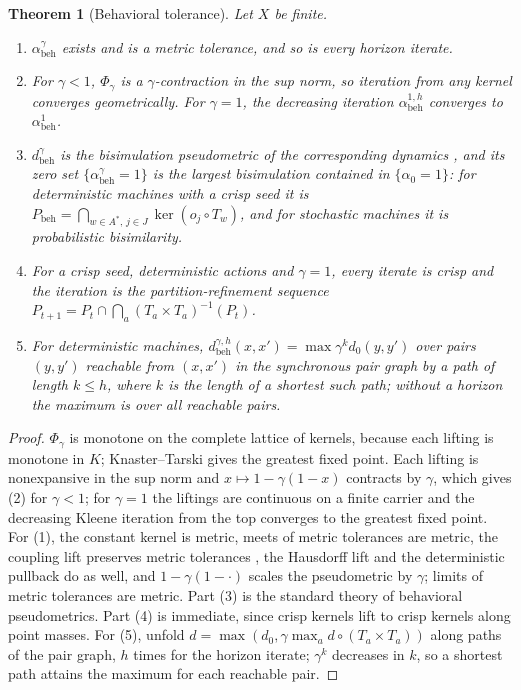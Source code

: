\documentclass[11pt]{article}
\newcommand{\abeh}{\alpha_{\mathrm{beh}}}
\newcommand{\dbeh}{d_{\mathrm{beh}}}
\newcommand{\Pbeh}{P_{\mathrm{beh}}}
\theoremstyle{definition}
\theoremstyle{plain}
\newtheorem{theorem}[definition]{Theorem}
\begin{document}
\begin{theorem}[Behavioral tolerance]\label{thm:behavioral}
Let $X$ be finite.
\begin{enumerate}
\item $\abeh^\gamma$ exists and is a metric tolerance, and so is every horizon iterate.
\item For $\gamma<1$, $\Phi_\gamma$ is a $\gamma$-contraction in the sup norm, so iteration from
any kernel converges geometrically. For $\gamma=1$, the decreasing iteration $\abeh^{1,h}$
converges to $\abeh^1$.
\item $\dbeh^\gamma$ is the bisimulation pseudometric of the corresponding dynamics
\cite{dgjp,vbw,ferns}, and its zero set $\{\abeh^\gamma=1\}$ is the largest bisimulation
contained in $\{\alpha_0=1\}$: for deterministic machines with a crisp seed it is
$\Pbeh=\bigcap_{w\in A^*,\,j\in J}\ker(o_j\circ T_w)$, and for stochastic machines it is
probabilistic bisimilarity.
\item For a crisp seed, deterministic actions and $\gamma=1$, every iterate is crisp and the
iteration is the partition-refinement sequence $P_{t+1}=P_t\cap\bigcap_a(T_a\times
T_a)^{-1}(P_t)$.
\item For deterministic machines, $\dbeh^{\gamma,h}(x,x')=\max\gamma^{k}d_0(y,y')$ over pairs
$(y,y')$ reachable from $(x,x')$ in the synchronous pair graph by a path of length $k\le h$, where
$k$ is the length of a shortest such path; without a horizon the maximum is over all reachable
pairs.
\end{enumerate}
\end{theorem}

\begin{proof}
$\Phi_\gamma$ is monotone on the complete lattice of kernels, because each lifting is monotone in
$K$; Knaster--Tarski gives the greatest fixed point. Each lifting is nonexpansive in the sup norm
and $x\mapsto1-\gamma(1-x)$ contracts by $\gamma$, which gives (2) for $\gamma<1$; for $\gamma=1$
the liftings are continuous on a finite carrier and the decreasing Kleene iteration from the top
converges to the greatest fixed point. For (1), the constant kernel is metric, meets of metric
tolerances are metric, the coupling lift preserves metric tolerances \cite[Theorem~6.13]{dclosure},
the Hausdorff lift and the deterministic pullback do as well, and $1-\gamma(1-\cdot)$ scales the
pseudometric by $\gamma$; limits of metric tolerances are metric. Part (3) is the standard theory
of behavioral pseudometrics. Part (4) is immediate, since crisp kernels lift to crisp kernels along
point masses. For (5), unfold $d=\max(d_0,\gamma\max_a d\circ(T_a\times T_a))$ along paths of the
pair graph, $h$ times for the horizon iterate; $\gamma^k$ decreases in $k$, so a shortest path
attains the maximum for each reachable pair.
\end{proof}
\end{document}
